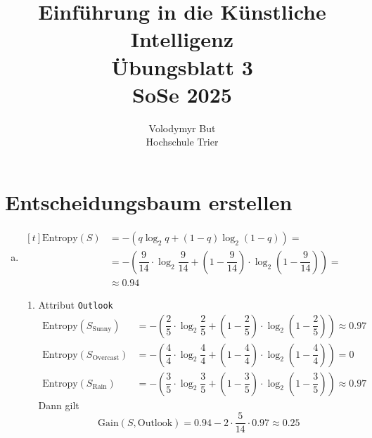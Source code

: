 \documentclass[10pt, oneside]{article}
\title{Einführung in die Künstliche Intelligenz\\[15pt]\Large{Übungsblatt 3}\\[10pt]\Large{SoSe 2025}}
\author{Volodymyr But\\[10pt]Hochschule Trier}
\date{}
\begin{document}
\maketitle
\vspace{25px}

\section{Entscheidungsbaum erstellen}

\begin{enumerate}[(a)]
    \item $\begin{aligned}[t]
            \text{Entropy}(S) &= -(q\log_2q + (1 - q)\log_2(1 - q)) = \\
                              &= -\left(\dfrac{9}{14} \cdot \log_2 \dfrac{9}{14} + \left(1 - \dfrac{9}{14}\right) \cdot \log_2\left(1 - \dfrac{9}{14}\right)\right) = \\
                              &\approx 0.94
        \end{aligned}$
        \begin{enumerate}[1.]
           \item Attribut \verb|Outlook|
                \begin{align*}
                    \text{Entropy}(S_\text{Sunny})    &= -\left(\dfrac{2}{5} \cdot \log_2 \dfrac{2}{5} + \left(1 - \dfrac{2}{5}\right) \cdot \log_2\left(1 - \dfrac{2}{5}\right)\right) \approx 0.97 \\[5pt]
                    \text{Entropy}(S_\text{Overcast}) &= -\left(\dfrac{4}{4} \cdot \log_2 \dfrac{4}{4} + \left(1 - \dfrac{4}{4}\right) \cdot \log_2\left(1 - \dfrac{4}{4}\right)\right) = 0 \\[5pt]
                    \text{Entropy}(S_\text{Rain})     &= -\left(\dfrac{3}{5} \cdot \log_2 \dfrac{3}{5} + \left(1 - \dfrac{3}{5}\right) \cdot \log_2\left(1 - \dfrac{3}{5}\right)\right) \approx 0.97
                \end{align*}
                Dann gilt
                \begin{equation*}
                    \text{Gain}(S, \text{Outlook}) = 0.94 - 2 \cdot \dfrac{5}{14} \cdot 0.97 \approx 0.25
                \end{equation*}


\end{enumerate}
\end{enumerate}
\end{document}
